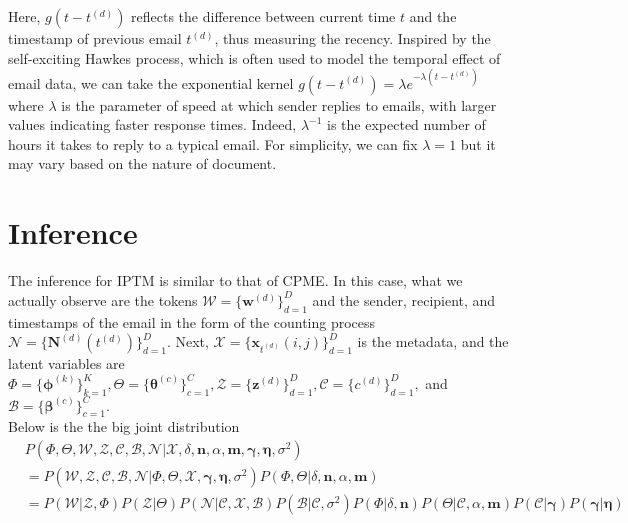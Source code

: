 \documentclass[a4paper]{article}
\begin{document}
Here, $g(t-t^{(d)})$ reflects the difference between current time $t$ and the timestamp of previous email $t^{(d)}$, thus measuring the recency. Inspired by the self-exciting Hawkes process, which is often used to model the temporal effect of email data, we can take the exponential kernel $g(t-t^{(d)})=\lambda e^{-\lambda(t-t^{(d)})}$ where $\lambda$ is the parameter of speed at
which sender replies to emails, with larger values indicating faster response times. Indeed, $\lambda^{-1}$ is the expected number of hours it takes to reply to a typical email. For simplicity, we can fix $\lambda=1$ but it may vary based on the nature of document.
\section{Inference}
The inference for IPTM is similar to that of CPME. In this case, what we actually observe are the tokens $\mathcal{W}=\{\boldsymbol{w}^{(d)} \}_{d=1}^{D}$ and the sender, recipient, and timestamps of the email in the form of the counting process $\mathcal{N}=\{\boldsymbol{N}^{(d)}(t^{(d)}) \}_{d=1}^{D}.$ Next,  $\mathcal{X}=\{\boldsymbol{x}_{t^{(d)}}(i, j)\}_{d=1}^{D}$ is the metadata, and the latent variables are $\Phi=\{\boldsymbol{\phi}^{(k)}\}_{k=1}^{K}, \Theta=\{\boldsymbol{\theta}^{(c)} \}_{c=1}^{C}, \mathcal{Z}=\{\boldsymbol{z}^{(d)} \}_{d=1}^{D}, \mathcal{C}=\{{c}^{(d)} \}_{d=1}^{D},$ and $\mathcal{B}=\{\boldsymbol{\beta}^{(c)} \}_{c=1}^{C}$.\\
\newline 
Below is the the big joint distribution
\begin{equation}
\begin{aligned}
& P(\Phi, \Theta, \mathcal{W}, \mathcal{Z}, \mathcal{C}, \mathcal{B}, \mathcal{N}| \mathcal{X}, \delta, \boldsymbol{n}, \alpha, \boldsymbol{m}, \boldsymbol{\gamma}, \boldsymbol{\eta}, \sigma^2) \\& 
=  P(\mathcal{W}, \mathcal{Z}, \mathcal{C}, \mathcal{B}, \mathcal{N}| \Phi, \Theta, \mathcal{X}, \boldsymbol{\gamma}, \boldsymbol{\eta}, \sigma^2) P(\Phi, \Theta |\delta, \boldsymbol{n}, \alpha, \boldsymbol{m})
\\&= P( \mathcal{W}| \mathcal{Z}, \Phi)P(\mathcal{Z}|\Theta)P(\mathcal{N}|\mathcal{C}, \mathcal{X}, \mathcal{B})P(\mathcal{B}|\mathcal{C}, \sigma^2)P(\Phi|\delta, \boldsymbol{n})P(\Theta|\mathcal{C}, \alpha, \boldsymbol{m})P(\mathcal{C}|\boldsymbol{\gamma})P(\boldsymbol{\gamma}|\boldsymbol{\eta})
\end{aligned}
\end{equation}
\end{document}
